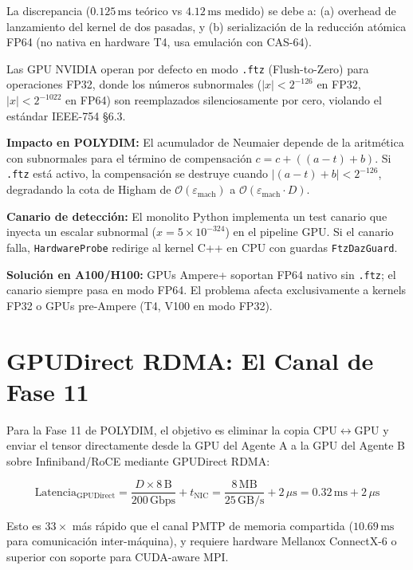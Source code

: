 La discrepancia ($0.125\,\text{ms}$ teórico vs $4.12\,\text{ms}$ medido) se debe a:
(a) overhead de lanzamiento del kernel de dos pasadas, y (b) serialización de la
reducción atómica FP64 (no nativa en hardware T4, usa emulación con CAS-64).

\begin{remark}
\label{rem:ftz_canary}
Las GPU NVIDIA operan por defecto en modo \texttt{.ftz} (Flush-to-Zero)
para operaciones FP32, donde los números subnormales 
($|x| < 2^{-126}$ en FP32, $|x| < 2^{-1022}$ en FP64) son reemplazados
silenciosamente por cero, violando el estándar IEEE-754 §6.3.

\textbf{Impacto en POLYDIM:} El acumulador de Neumaier depende de la
aritmética con subnormales para el término de compensación 
$c = c + ((a - t) + b)$. Si \texttt{.ftz} está activo, la compensación
se destruye cuando $|(a - t) + b| < 2^{-126}$, degradando la cota de
Higham de $\mathcal{O}(\varepsilon_{\text{mach}})$ a 
$\mathcal{O}(\varepsilon_{\text{mach}} \cdot D)$.

\textbf{Canario de detección:} El monolito Python implementa un test
canario que inyecta un escalar subnormal ($x = 5 \times 10^{-324}$) 
en el pipeline GPU. Si el canario falla, \texttt{HardwareProbe} redirige
al kernel C++ en CPU con guardas \texttt{FtzDazGuard}.

\textbf{Solución en A100/H100:} GPUs Ampere+ soportan FP64 nativo sin
\texttt{.ftz}; el canario siempre pasa en modo FP64. El problema afecta
exclusivamente a kernels FP32 o GPUs pre-Ampere (T4, V100 en modo FP32).
\end{remark}

\section{GPUDirect RDMA: El Canal de Fase 11}

Para la Fase 11 de POLYDIM, el objetivo es eliminar la copia CPU$\leftrightarrow$GPU
y enviar el tensor directamente desde la GPU del Agente A a la GPU del Agente B
sobre Infiniband/RoCE mediante GPUDirect RDMA:

\begin{equation}
\text{Latencia}_{\text{GPUDirect}} = \frac{D \times 8\,\text{B}}{200\,\text{Gbps}} + t_{\text{NIC}}
= \frac{8\,\text{MB}}{25\,\text{GB/s}} + 2\,\mu\text{s} = 0.32\,\text{ms} + 2\,\mu\text{s}
\end{equation}

Esto es $33\times$ más rápido que el canal PMTP de memoria compartida
($10.69\,\text{ms}$ para comunicación inter-máquina), y requiere hardware Mellanox
ConnectX-6 o superior con soporte para CUDA-aware MPI.
